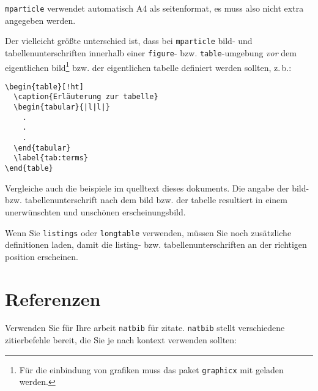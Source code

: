 \documentclass[11pt,twoside]{mparticle}
\newcommand{\package}[1]{\texttt{#1}}
\begin{document}
\package{mparticle} verwendet automatisch A4 als seitenformat, es muss
also nicht extra angegeben werden.

Der vielleicht größte unterschied ist, dass bei \package{mparticle}
bild- und tabellenunterschriften innerhalb einer \texttt{figure}- bzw.
\texttt{table}-umgebung \emph{vor} dem eigentlichen bild\footnote{Für
  die einbindung von grafiken muss das paket \package{graphicx} mit
  geladen werden.} bzw. der eigentlichen tabelle definiert werden
sollten, z.\,b.:

\begin{verbatim}
\begin{table}[!ht]
  \caption{Erläuterung zur tabelle}
  \begin{tabular}{|l|l|}
    .
    .
    .
  \end{tabular}
  \label{tab:terms}
\end{table}
\end{verbatim}

Vergleiche auch die beispiele im quelltext dieses dokuments. Die
angabe der bild- bzw. tabellenunterschrift nach dem bild bzw. der
tabelle resultiert in einem unerwünschten und unschönen
erscheinungsbild.

Wenn Sie \package{listings} oder \package{longtable} verwenden, müssen
Sie noch zusätzliche definitionen laden, damit die listing-
bzw. tabellenunterschriften an der richtigen position erscheinen.

\section{Referenzen}
\label{sec:referenzen}

Verwenden Sie für Ihre arbeit \package{natbib} für zitate.
\package{natbib} stellt verschiedene zitierbefehle bereit, die Sie je
nach kontext verwenden sollten:
\end{document}
